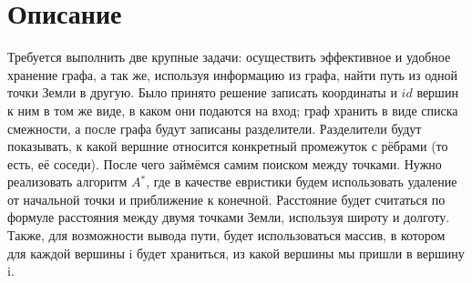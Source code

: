 \section{Описание}
Требуется выполнить две крупные задачи: осуществить эффективное и удобное хранение графа, а так же, используя информацию из графа, найти путь из одной точки Земли в другую. Было принято решение записать координаты и $id$ вершин к ним в том же виде, в каком они подаются на вход; граф хранить в виде списка смежности, а после графа будут записаны разделители. Разделители будут показывать, к какой вершние относится конкретный промежуток с рёбрами (то есть, её соседи). После чего займёмся самим поиском между точками. Нужно реализовать алгоритм $A$$^*$, где в качестве евристики будем использовать удаление от начальной точки и приближение к конечной. Расстояние будет считаться по формуле расстояния между двумя точками Земли, используя широту и долготу. Также, для возможности вывода пути, будет использоваться массив, в котором для каждой вершины i будет храниться, из какой вершины мы пришли в вершину i.

\pagebreak

